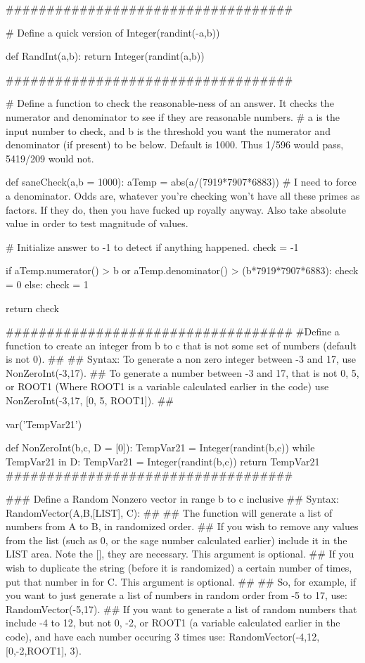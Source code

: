 \begin{sagesilent}
###################################

# Define a quick version of Integer(randint(-a,b))

def RandInt(a,b):
    return Integer(randint(a,b))


###################################

# Define a function to check the reasonable-ness of an answer. It checks the numerator and denominator to see if they are reasonable numbers.
# a is the input number to check, and b is the threshold you want the numerator and denominator (if present) to be below. Default is 1000. Thus 1/596 would pass, 5419/209 would not.

def saneCheck(a,b = 1000):
   aTemp = abs(a/(7919*7907*6883)) # I need to force a denominator. Odds are, whatever you're checking won't have all these primes as factors. If they do, then you have fucked up royally anyway. Also take absolute value in order to test magnitude of values.
   
   # Initialize answer to -1 to detect if anything happened.
   check = -1
   
   if aTemp.numerator() > b or aTemp.denominator() > (b*7919*7907*6883):
      check = 0
   else:
      check = 1
   
   return check


###################################
#Define a function to create an integer from b to c that is not some set of numbers (default is not 0).
## 
## Syntax: To generate a non zero integer between -3 and 17, use NonZeroInt(-3,17).
## To generate a number between -3 and 17, that is not 0, 5, or ROOT1 (Where ROOT1 is a variable calculated earlier in the code) use NonZeroInt(-3,17, [0, 5, ROOT1]).
## 


var('TempVar21')

def NonZeroInt(b,c, D = [0]):
   TempVar21 = Integer(randint(b,c))
   while TempVar21 in D:
      TempVar21 = Integer(randint(b,c))
   return TempVar21
###################################


### Define a Random Nonzero vector in range b to c inclusive
## Syntax: RandomVector(A,B,[LIST], C):
##
## The function will generate a list of numbers from A to B, in randomized order. 
## If you wish to remove any values from the list (such as 0, or the sage number calculated earlier) include it in the LIST area. Note the [], they are necessary. This argument is optional.
## If you wish to duplicate the string (before it is randomized) a certain number of times, put that number in for C. This argument is optional.
## 
## So, for example, if you want to just generate a list of numbers in random order from -5 to 17, use: RandomVector(-5,17).
## If you want to generate a list of random numbers that include -4 to 12, but not 0, -2, or ROOT1 (a variable calculated earlier in the code), and have each number occuring 3 times use: RandomVector(-4,12,[0,-2,ROOT1], 3).


\end{sagesilent}
